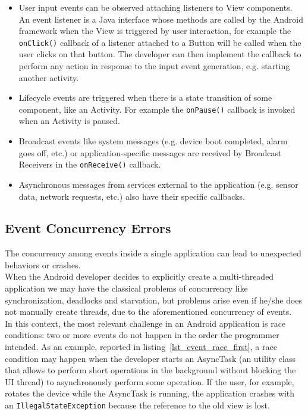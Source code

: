 \documentclass[11pt,a4paper,notitlepage]{article}
\begin{document}
\begin{itemize}
	\item User input events can be observed attaching listeners to View components. An event listener is a Java interface whose methods are called by the Android framework when the View is triggered by user interaction, for example the \texttt{onClick()} callback of a listener attached to a Button will be called when the user clicks on that button. The developer can then implement the callback to perform any action in response to the input event generation, e.g. starting another activity.
	\item Lifecycle events are triggered when there is a state transition of some component, like an Activity. For example the \texttt{onPause()} callback is invoked when an Activity is paused.
	\item Broadcast events like system messages (e.g. device boot completed, alarm goes off, etc.) or application-specific messages are received by Broadcast Receivers in the \texttt{onReceive()} callback.
	\item Asynchronous messages from services external to the application (e.g. sensor data, network requests, etc.) also have their specific callbacks.
\end{itemize}

\subsection{Event Concurrency Errors}
The concurrency among events inside a single application can lead to unexpected behaviors or crashes.\medskip \\
When the Android developer decides to explicitly create a multi-threaded application we may have the classical problems of concurrency like synchronization, deadlocks and starvation, but problems arise even if he/she does not manually create threads, due to the aforementioned concurrency of events.\medskip \\
In this context, the most relevant challenge in an Android application is race conditions: two or more events do not happen in the order the programmer intended. As an example, reported in listing~\ref{lst_event_race_first}, a race condition may happen when the developer starts an AsyncTask (an utility class that allows to perform short operations in the background without blocking the UI thread) to asynchronously perform some operation. If the user, for example, rotates the device while the AsyncTask is running, the application crashes with an \texttt{IllegalStateException} because the reference to the old view is lost.
\end{document}
